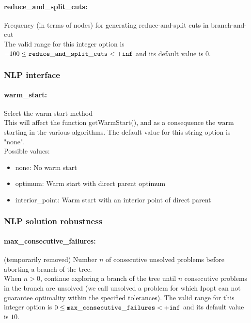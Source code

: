 \paragraph{reduce\_and\_split\_cuts:}\label{sec:reduce_and_split_cuts} Frequency (in terms of nodes) for generating reduce-and-split cuts in branch-and-cut $\;$ \\
The valid range for this integer option is
$-100 \le {\tt reduce\_and\_split\_cuts } <  {\tt +inf}$
and its default value is $0$.


\subsubsection{NLP interface}
\label{sec:NLP_interface}

\paragraph{warm\_start:}\label{sec:warm_start} Select the warm start method $\;$ \\
 This will affect the function getWarmStart(), and
as a consequence the warm starting in the various
algorithms.
The default value for this string option is "none".
\\ 
Possible values:
\begin{itemize}
   \item none: No warm start
   \item optimum: Warm start with direct parent optimum
   \item interior\_point: Warm start with an interior point of direct
parent
\end{itemize}

\subsubsection{NLP solution robustness}
\label{sec:NLP_solution_robustness}

\paragraph{max\_consecutive\_failures:}\label{sec:max_consecutive_failures} (temporarily removed) Number $n$ of consecutive unsolved problems before aborting a branch of the tree. $\;$ \\
 When $n > 0$, continue exploring a branch of the
tree until $n$ consecutive problems in the branch
are unsolved (we call unsolved a problem for
which Ipopt can not guarantee optimality within
the specified tolerances). The valid range for this integer option is
$0 \le {\tt max\_consecutive\_failures } <  {\tt +inf}$
and its default value is $10$.


